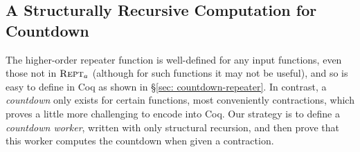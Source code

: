 
\subsection{A Structurally Recursive Computation for Countdown}

The higher-order repeater function is well-defined for any input functions, even those not in $\text{\scshape{Rept}}_a$ (although for such functions it may not be useful), and so is easy to define
in Coq as shown in \S\ref{sec: countdown-repeater}.  In contrast, a \emph{countdown} only exists 
for certain functions, most conveniently contractions, which proves a little more challenging to
encode into Coq. Our strategy is to define a \emph{countdown worker}, written with only
structural recursion, and then prove that this worker computes the countdown when given a contraction.

